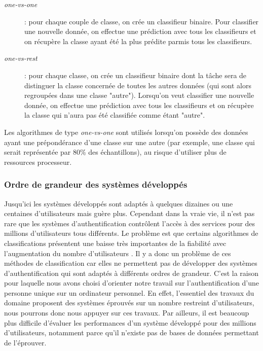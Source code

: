 
\begin{description}
	\item[\textit{one-vs-one}] : pour chaque couple de classe, on crée un classifieur binaire. Pour classifier une nouvelle donnée, on effectue une prédiction avec tous les classifieurs et on récupère la classe ayant été la plus prédite parmis tous les classifieurs.
	\item[\textit{one-vs-rest}] : pour chaque classe, on crée un classifieur binaire dont la tâche sera de distinguer la classe concernée de toutes les autres données (qui sont alors regroupées dans une classe "autre"). Lorsqu'on veut classifier une nouvelle donnée, on effectue une prédiction avec tous les classifieurs et on récupère la classe qui n'aura pas été classifiée comme étant "autre".
\end{description}

Les algorithmes de type \textit{one-vs-one} sont utilisés lorsqu'on possède des données ayant une prépondérance d'une classe sur une autre (par exemple, une classe qui serait représentée par 80\% des échantillons), au risque d'utiliser plus de ressources processeur.

\subsubsection{Ordre de grandeur des systèmes développés}

Jusqu'ici les systèmes développés sont adaptés à quelques dizaines ou une centaines d'utilisateurs mais guère plus. Cependant dans la vraie vie, il n'est pas rare que les systèmes d'authentification contrôlent l'accès à des services pour des millions d'utilisateurs tous différents. Le problème est que certains algorithmes de classifications présentent une baisse très importantes de la fiabilité avec l'augmentation du nombre d'utilisateurs \cite{panasiuk2016}. Il y a donc un problème de ces méthodes de classification car elles ne permettent pas de développer des systèmes d'authentification qui sont adaptés à différents ordres de grandeur. C'est la raison pour laquelle nous avons choisi d'orienter notre travail sur l'authentification d'une personne unique sur un ordinateur personnel. En effet, l'essentiel des travaux du domaine proposent des systèmes éprouvés sur un nombre restreint d'utilisateurs, nous pourrons donc nous appuyer sur ces travaux. Par ailleurs, il est beaucoup plus difficile d'évaluer les performances d'un système développé pour des millions d'utilisateurs, notamment parce qu'il n'existe pas de bases de données permettant de l'éprouver.


